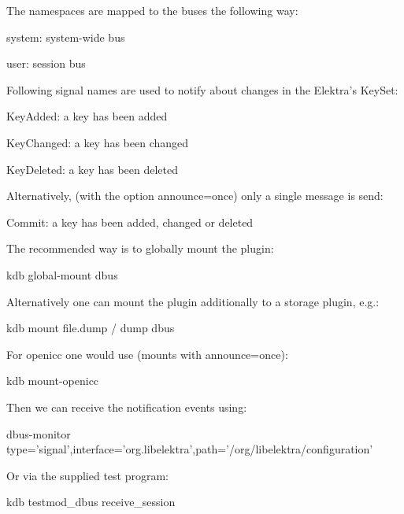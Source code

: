 The namespaces are mapped to the buses the following way\+:


\begin{DoxyItemize}
\item system\+: system-\/wide bus
\item user\+: session bus
\end{DoxyItemize}

Following signal names are used to notify about changes in the Elektra’s Key\+Set\+:


\begin{DoxyItemize}
\item Key\+Added\+: a key has been added
\item Key\+Changed\+: a key has been changed
\item Key\+Deleted\+: a key has been deleted
\end{DoxyItemize}

Alternatively, (with the option announce=once) only a single message is send\+:


\begin{DoxyItemize}
\item Commit\+: a key has been added, changed or deleted
\end{DoxyItemize}

The recommended way is to globally mount the plugin\+:


\begin{DoxyCode}
kdb global-mount dbus
\end{DoxyCode}


Alternatively one can mount the plugin additionally to a storage plugin, e.\+g.\+:


\begin{DoxyCode}
kdb mount file.dump / dump dbus
\end{DoxyCode}


For openicc one would use (mounts with announce=once)\+:


\begin{DoxyCode}
kdb mount-openicc
\end{DoxyCode}


Then we can receive the notification events using\+:


\begin{DoxyCode}
dbus-monitor type='signal',interface='org.libelektra',path='/org/libelektra/configuration'
\end{DoxyCode}


Or via the supplied test program\+:


\begin{DoxyCode}
kdb testmod\_dbus receive\_session
\end{DoxyCode}


